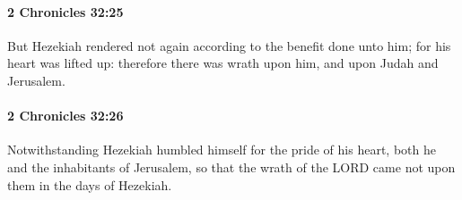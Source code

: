		\paragraph{2 Chronicles 32:25} %
			\label{2CHRONICLES-32-25}

			But Hezekiah rendered not again according to the benefit done unto him; for his heart was lifted up: therefore there was wrath upon him, and upon Judah and Jerusalem.


		\paragraph{2 Chronicles 32:26} %
			\label{2CHRONICLES-32-26}

			Notwithstanding Hezekiah humbled himself for the pride of his heart, both he and the inhabitants of Jerusalem, so that the wrath of the LORD came not upon them in the days of Hezekiah.

